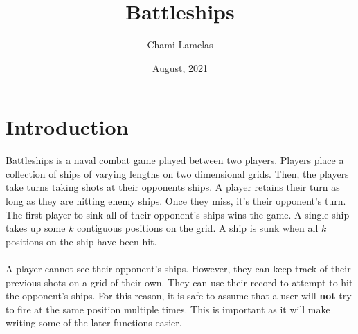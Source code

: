 \documentclass{article}
\title{Battleships
}
\author{Chami Lamelas}
\date{August, 2021}
\begin{document}
\maketitle

\section*{Introduction}
Battleships is a naval combat game played between two players. Players place a collection of ships of varying lengths on two dimensional grids. Then, the players take turns taking shots at their opponents ships. A player retains their turn as long as they are hitting enemy ships. Once they miss, it's their opponent's turn. The first player to sink all of their opponent's ships wins the game. A single ship takes up some $k$ contiguous positions on the grid. A ship is sunk when all $k$ positions on the ship have been hit.\\\\
A player cannot see their opponent's ships. However, they can keep track of their previous shots on a grid of their own. They can use their record to attempt to hit the opponent's ships. For this reason, it is safe to assume that a user will \textbf{not} try to fire at the same position multiple times. This is important as it will make writing some of the later functions easier.
\end{document}
